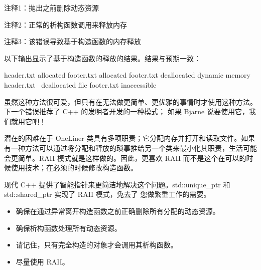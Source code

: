 {\footnotesize
注释1：抛出之前删除动态资源

注释2：正常的析构函数调用来释放内存

注释3：该错误导致基于构造函数的内存释放
}

以下输出显示了基于构造函数的释放的结果。结果与预期一致：

\begin{shell}
header.txt allocated
footer.txt allocated
footer.txt deallocated dynamic memory
header.txt ~deallocated
file footer.txt inaccessible
\end{shell}

虽然这种方法很可爱，但只有在无法做更简单、更优雅的事情时才使用这种方法。下一个错误推荐了 C++ 的发明者开发的一种模式； 如果 Bjarne 说要使用它，我们就用它吧！

潜在的困难在于 OneLiner 类具有多项职责；它分配内存并打开和读取文件。如果有一种方法可以通过将分配和释放的琐事推给另一个类来最小化其职责，生活可能会更简单。RAII 模式就是这样做的。因此，更喜欢 RAII 而不是这个在可以的时候使用技术；在必须的时候修改构造函数。

现代 C++ 提供了智能指针来更简洁地解决这个问题。std::unique\_ptr 和 std::shared\_ptr 实现了 RAII 模式，免去了 您做繁重工作的需要。


\begin{itemize}
\item
确保在通过异常离开构造函数之前正确删除所有分配的动态资源。

\item
确保析构函数处理所有动态资源。

\item
请记住，只有完全构造的对象才会调用其析构函数。

\item
尽量使用 RAII。
\end{itemize}













